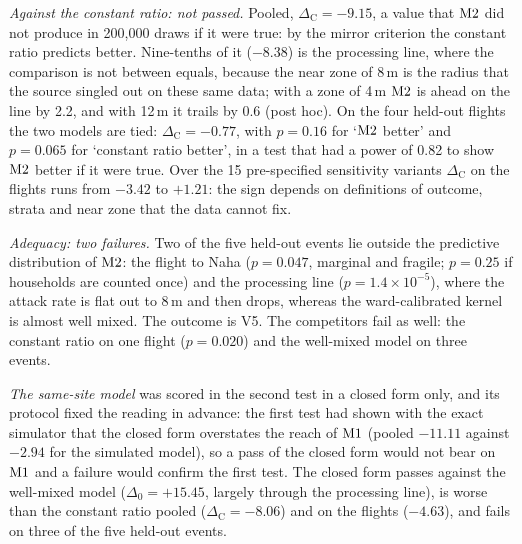 \emph{Against the constant ratio: not passed.} Pooled, $\Delta_{\mathrm{C}}=-9.15$, a value that $\mathrm{M2}$ did not
produce in 200{,}000 draws if it were true: by the mirror criterion the constant ratio predicts better.
Nine-tenths of it ($-8.38$) is the processing line, where the comparison is not between equals, because the near
zone of 8\,m is the radius that the source singled out on these same data; with a zone of 4\,m $\mathrm{M2}$ is ahead on
the line by 2.2, and with 12\,m it trails by 0.6 (post hoc). On the four held-out flights the two models are tied:
$\Delta_{\mathrm{C}}=-0.77$, with $p=0.16$ for `$\mathrm{M2}$ better' and $p=0.065$ for `constant ratio better', in a
test that had a power of 0.82 to show $\mathrm{M2}$ better if it were true. Over the 15 pre-specified sensitivity
variants $\Delta_{\mathrm{C}}$ on the flights runs from $-3.42$ to $+1.21$: the sign depends on definitions of
outcome, strata and near zone that the data cannot fix.

\emph{Adequacy: two failures.} Two of the five held-out events lie outside the predictive distribution of
$\mathrm{M2}$: the flight to Naha ($p=0.047$, marginal and fragile; $p=0.25$ if households are counted once) and the
processing line ($p=1.4\times10^{-5}$), where the attack rate is flat out to 8\,m and then drops, whereas the
ward-calibrated kernel is almost well mixed. The outcome is V5. The competitors fail as well: the constant ratio
on one flight ($p=0.020$) and the well-mixed model on three events.

\emph{The same-site model} was scored in the second test in a closed form only, and its protocol fixed the
reading in advance: the first test had shown with the exact simulator that the closed form overstates the reach
of $\mathrm{M1}$ (pooled $-11.11$ against $-2.94$ for the simulated model), so a pass of the closed form would not bear
on $\mathrm{M1}$ and a failure would confirm the first test. The closed form passes against the well-mixed model
($\Delta_0=+15.45$, largely through the processing line), is worse than the constant ratio pooled
($\Delta_{\mathrm{C}}=-8.06$) and on the flights ($-4.63$), and fails on three of the five held-out events.

